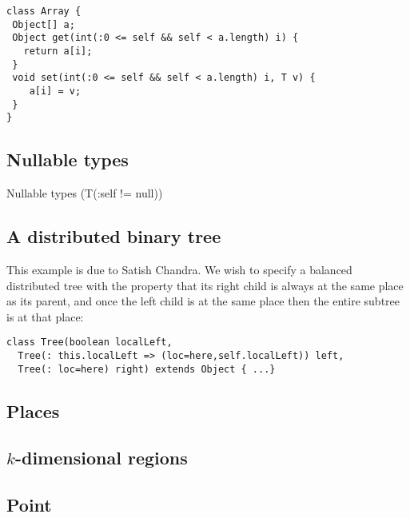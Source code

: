 {\footnotesize
\begin{verbatim}
class Array {
 Object[] a;
 Object get(int(:0 <= self && self < a.length) i) { 
   return a[i]; 
 }
 void set(int(:0 <= self && self < a.length) i, T v) {
    a[i] = v; 
 }
}
\end{verbatim}}

\subsection{Nullable types}

Nullable types (T(:self != null))


\subsection{A distributed binary tree}
This example is due to Satish Chandra. We wish to specify a balanced
distributed tree with the property that its right child is always at
the same place as its parent, and once the left child is at the same
place then the entire subtree is at that place:

{\footnotesize
\begin{verbatim}
class Tree(boolean localLeft,
  Tree(: this.localLeft => (loc=here,self.localLeft)) left, 
  Tree(: loc=here) right) extends Object { ...}
\end{verbatim}}

\subsection{Places}

% 

\subsection{$k$-dimensional regions}

% 

\subsection{Point}


% 

